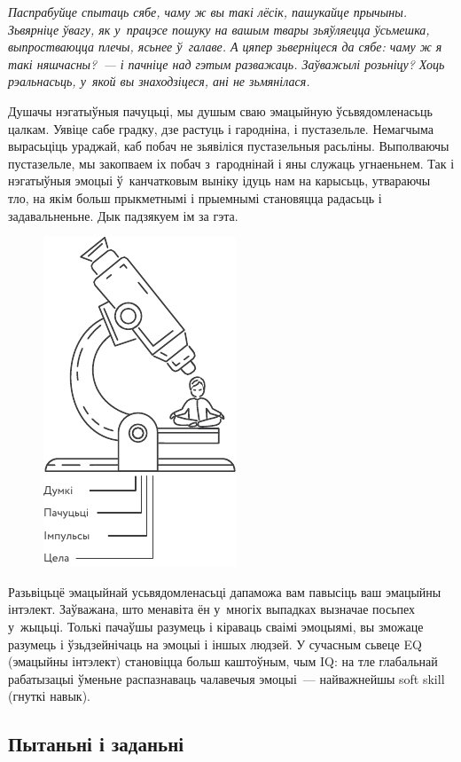 \emph{Паспрабуйце спытаць сябе, чаму ж вы такі лёсік, пашукайце прычыны. Зьвярніце ўвагу, як у~працэсе пошуку на вашым твары зьяўляецца ўсьмешка, выпростваюцца плечы, ясьнее ў~галаве. А цяпер зьверніцеся да сябе: чаму ж я такі няшчасны?~--- і пачніце над гэтым разважаць. Заўважылі розьніцу? Хоць рэальнасьць, у~якой вы знаходзіцеся, ані не зьмянілася.}

Душачы нэгатыўныя пачуцьці, мы душым сваю эмацыйную ўсьвядомленасьць цалкам. Уявіце сабе градку, дзе растуць і гародніна, і пустазельле. Немагчыма вырасьціць ураджай, каб побач не зьявіліся пустазельныя расьліны. Выполваючы пустазельле, мы закопваем іх побач з~гароднінай і яны служаць угнаеньнем. Так і нэгатыўныя эмоцыі ў~канчатковым выніку ідуць нам на карысьць, утвараючы тло, на якім больш прыкметнымі і прыемнымі становяцца радасьць і задавальненьне. Дык падзякуем ім за гэта.

\begin{figure}[htb!]
  \centering
  \includegraphics[scale=1.5]{willpower/ch8/10.pdf}
\end{figure}

Разьвіцьцё эмацыйнай усьвядомленасьці дапаможа вам павысіць ваш эмацыйны інтэлект. Заўважана, што менавіта ён у~многіх выпадках вызначае посьпех у~жыцьці. Толькі пачаўшы разумець і кіраваць сваімі эмоцыямі, вы зможаце разумець і ўзьдзейнічаць на эмоцыі і іншых людзей. У сучасным сьвеце EQ (эмацыйны інтэлект) становіцца больш каштоўным, чым IQ: на тле глабальнай рабатызацыі ўменьне распазнаваць чалавечыя эмоцыі~--- найважнейшы soft skill (гнуткі навык).

\subsection*{Пытаньні і заданьні}

